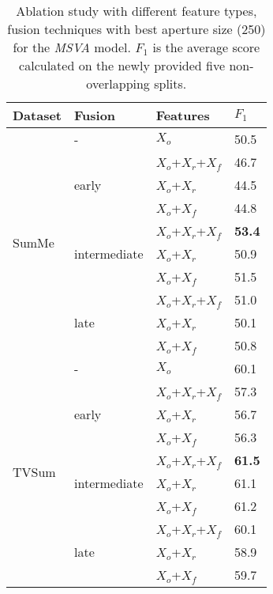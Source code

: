 \documentclass{article}
\begin{document}
\begin{table}[!ht]
\caption{Ablation study with different feature types, fusion techniques with best aperture size (250) for the \textit{MSVA} model. $F_{1}$ is the average score calculated on the newly provided five non-overlapping splits.}
\centering
\begin{tabular}{|*{4}{l|}}
\hline 
\textbf{Dataset}  & Fusion & Features& $F_{1}$ \\ \hline
  & - & $X_o$ & 50.5 \\  \cline{2-4} 
  & \multirow{3}{5em}{early} & $X_{o}$+$X_{r}$+$X_{f}$ & 46.7 \\ \cline{3-4} 
  &  & $X_{o}$+$X_{r}$ &  44.5 \\ \cline{3-4} 
\multirow{4}{4em}{SumMe}   &  & $X_{o}$+$X_{f}$ &  44.8 \\ \cline{2-4} 
   
 &  \multirow{3}{5em}{intermediate} & $X_o$+$X_r$+$X_f$ & \textbf{53.4} \\ \cline{3-4}
 &  & $X_{o}$+$X_{r}$ & 50.9 \\ \cline{3-4} 
&  & $X_{o}$+$X_{f}$ &  51.5 \\ \cline{2-4} 
   
 & \multirow{3}{5em}{late}  & $X_o$+$X_r$+$X_f$ & 51.0 \\  \cline{3-4}
 &  & $X_{o}$+$X_{r}$  & 50.1 \\ \cline{3-4} 
&  & $X_{o}$+$X_{f}$  & 50.8 \\ \cline{2-4} 

 
\hline 
\hline 
 
 & - & $X_o$  & 60.1 \\ \cline{2-4}
 & \multirow{3}{5em}{early}  & $X_o$+$X_r$+$X_f$  & 57.3 \\  \cline{3-4}
&  & $X_{o}$+$X_{r}$ & 56.7 \\ \cline{3-4} 
\multirow{4}{4em}{TVSum} &  & $X_{o}$+$X_{f}$ &  56.3 \\ \cline{2-4} 
   
 & \multirow{3}{5em}{intermediate} & $X_o$+$X_r$+$X_f$ &  \textbf{61.5} \\  \cline{3-4}
 &  & $X_{o}$+$X_{r}$ & 61.1 \\ \cline{3-4} 
&  & $X_{o}$+$X_{f}$ & 61.2 \\ \cline{2-4}

 & \multirow{3}{5em}{late} & $X_o$+$X_r$+$X_f$ & 60.1 \\  \cline{3-4}
 &  & $X_{o}$+$X_{r}$ &  58.9 \\ \cline{3-4} 
&  & $X_{o}$+$X_{f}$ &  59.7 \\ \cline{2-4} 
\hline 
 
\end{tabular}
\label{tab:ablation}
\end{table}
\end{document}
